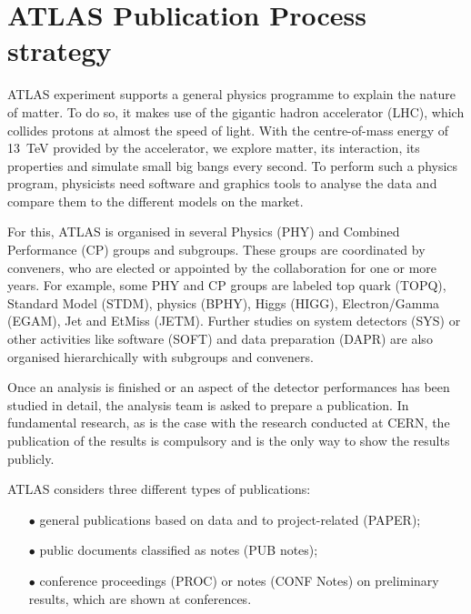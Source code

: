 
\section{ATLAS Publication Process strategy}%
\label{sec:ATLAS_work_strategy}


ATLAS experiment supports a  general physics programme to explain the nature of matter. To do so,  it makes use of the gigantic hadron accelerator (LHC), which collides protons at almost the speed of light. With the centre-of-mass energy of \SI{13}{\TeV} provided by the accelerator, we explore matter, its interaction, its properties and simulate small big bangs every second. To perform such a physics program, physicists need software and graphics tools to analyse the data and compare them to the different models on the market.

For this, ATLAS is organised in several Physics (PHY) and  Combined Performance (CP) groups and subgroups. These groups are coordinated by conveners, who are elected or appointed by the collaboration for one or more years.
For example, some  PHY and CP groups are labeled top quark (TOPQ), Standard Model (STDM), \PB physics (BPHY), Higgs (HIGG), Electron/Gamma (EGAM), Jet and EtMiss (JETM).
Further studies on system detectors (SYS) or other activities like software (SOFT) and data preparation (DAPR) are also organised hierarchically with subgroups and conveners.

Once an analysis is finished or an aspect of the detector performances has been studied in detail,
the analysis team is asked to prepare a publication.
In fundamental research, as is the case with the research conducted at CERN, the publication of the results is  compulsory and is the only way to show the results publicly.

ATLAS considers three different types of publications:
\begin{itemize}
    \item[$\bullet$] general publications based on data and to project-related  (PAPER);
    \item[$\bullet$] public documents classified as notes (PUB notes);
    \item[$\bullet$] conference proceedings (PROC) or notes (CONF Notes) on preliminary results, which are shown at conferences.
\end{itemize}

